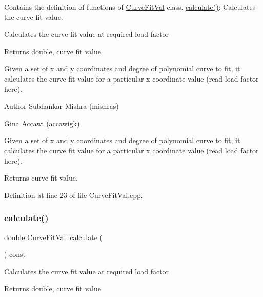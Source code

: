 Contains the definition of functions of \hyperlink{class_curve_fit_val}{Curve\+Fit\+Val} class. \hyperlink{class_curve_fit_val_af928003c67aed9c644632a548be08713}{calculate()}\+: Calculates the curve fit value. 

Calculates the curve fit value at required load factor \begin{DoxyReturn}{Returns}
double, curve fit value
\end{DoxyReturn}
Given a set of x and y coordinates and degree of polynomial curve to fit, it calculates the curve fit value for a particular x coordinate value (read load factor here).

\begin{DoxyAuthor}{Author}
Subhankar Mishra (mishras) 

Gina Accawi (accawigk) 
\end{DoxyAuthor}
Given a set of x and y coordinates and degree of polynomial curve to fit, it calculates the curve fit value for a particular x coordinate value (read load factor here). \begin{DoxyReturn}{Returns}
curve fit value. 
\end{DoxyReturn}


Definition at line 23 of file Curve\+Fit\+Val.\+cpp.

\mbox{\label{class_curve_fit_val_af928003c67aed9c644632a548be08713}} 
\subsubsection{\texorpdfstring{calculate()}{calculate()}\hspace{0.1cm}{\footnotesize\ttfamily [2/3]}}
{\footnotesize\ttfamily double Curve\+Fit\+Val\+::calculate (\begin{DoxyParamCaption}{ }\end{DoxyParamCaption}) const}

Calculates the curve fit value at required load factor \begin{DoxyReturn}{Returns}
double, curve fit value 
\end{DoxyReturn}
\mbox{\label{class_curve_fit_val_af928003c67aed9c644632a548be08713}} 

